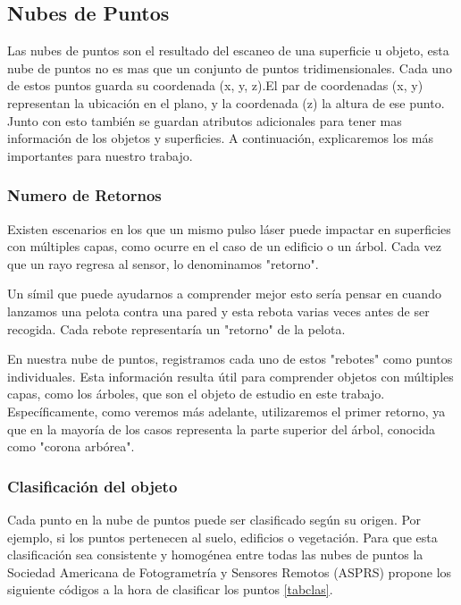 \subsection{Nubes de Puntos}
Las nubes de puntos son el resultado del escaneo de una superficie u objeto, esta nube de puntos no es mas que un conjunto de puntos tridimensionales. Cada uno de estos puntos guarda su coordenada (x, y, z).El par de coordenadas (x, y) representan la ubicación en el plano, y la coordenada (z) la altura de ese punto. Junto con esto también se guardan atributos adicionales para tener mas información de los objetos y superficies. A continuación, explicaremos los más importantes para nuestro trabajo.


\subsubsection{Numero de Retornos}
Existen escenarios en los que un mismo pulso láser puede impactar en superficies con múltiples capas, como ocurre en el caso de un edificio o un árbol. Cada vez que un rayo regresa al sensor, lo denominamos "retorno".

Un símil que puede ayudarnos a comprender mejor esto sería pensar en cuando lanzamos una pelota contra una pared y esta rebota varias veces antes de ser recogida. Cada rebote representaría un "retorno" de la pelota.

En nuestra nube de puntos, registramos cada uno de estos "rebotes" como puntos individuales. Esta información resulta útil para comprender objetos con múltiples capas, como los árboles, que son el objeto de estudio en este trabajo. Específicamente, como veremos más adelante, utilizaremos el primer retorno, ya que en la mayoría de los casos representa la parte superior del árbol, conocida como "corona arbórea".

\subsubsection{Clasificación del objeto}
Cada punto en la nube de puntos puede ser clasificado según su origen. Por ejemplo, si los puntos pertenecen al suelo, edificios o vegetación. Para que esta clasificación sea consistente y homogénea entre todas las nubes de puntos la Sociedad Americana de Fotogrametría y Sensores Remotos (ASPRS) \cite{ASPRS-LAS} propone los siguiente códigos a la hora de clasificar los puntos \ref{tabclas}.

